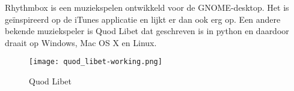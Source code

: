 Rhythmbox is een muziekspelen ontwikkeld voor de GNOME-desktop. Het is ge\"inspireerd op de iTunes applicatie en lijkt er dan ook erg op. Een andere bekende muziekspeler is Quod Libet dat geschreven is in python en daardoor draait op Windows, Mac OS X en Linux.

\begin{center}
\begin{figure}[H]
\texttt{[image: quod\_libet-working.png]}
\caption{Quod Libet}
\end{figure}
\end{center}

